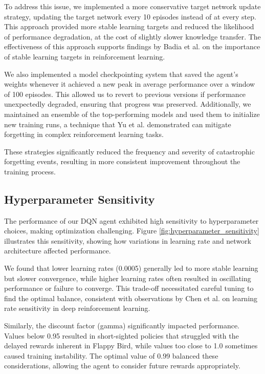 To address this issue, we implemented a more conservative target network update strategy, updating the target network every 10 episodes instead of at every step. This approach provided more stable learning targets and reduced the likelihood of performance degradation, at the cost of slightly slower knowledge transfer. The effectiveness of this approach supports findings by Badia et al. \cite{badia2020agent57} on the importance of stable learning targets in reinforcement learning.

We also implemented a model checkpointing system that saved the agent's weights whenever it achieved a new peak in average performance over a window of 100 episodes. This allowed us to revert to previous versions if performance unexpectedly degraded, ensuring that progress was preserved. Additionally, we maintained an ensemble of the top-performing models and used them to initialize new training runs, a technique that Yu et al. \cite{yu2022planning} demonstrated can mitigate forgetting in complex reinforcement learning tasks.

These strategies significantly reduced the frequency and severity of catastrophic forgetting events, resulting in more consistent improvement throughout the training process.

\subsection{Hyperparameter Sensitivity}

The performance of our DQN agent exhibited high sensitivity to hyperparameter choices, making optimization challenging. Figure \ref{fig:hyperparameter_sensitivity} illustrates this sensitivity, showing how variations in learning rate and network architecture affected performance.

We found that lower learning rates (0.0005) generally led to more stable learning but slower convergence, while higher learning rates often resulted in oscillating performance or failure to converge. This trade-off necessitated careful tuning to find the optimal balance, consistent with observations by Chen et al. \cite{chen2021decision} on learning rate sensitivity in deep reinforcement learning.

Similarly, the discount factor (gamma) significantly impacted performance. Values below 0.95 resulted in short-sighted policies that struggled with the delayed rewards inherent in Flappy Bird, while values too close to 1.0 sometimes caused training instability. The optimal value of 0.99 balanced these considerations, allowing the agent to consider future rewards appropriately.

